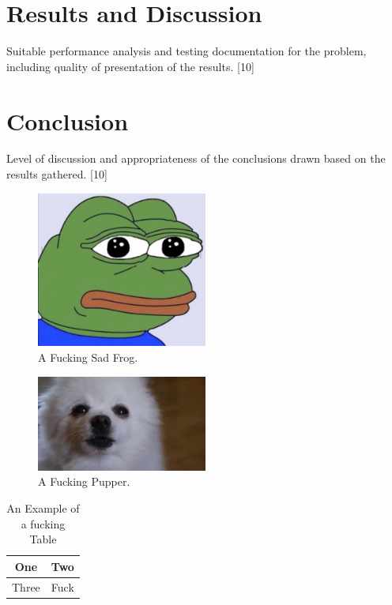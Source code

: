 \documentclass[journal,transmag]{IEEEtran}
\begin{document}
	\lipsum[1-2]
	
	\section{Results and Discussion}
	Suitable performance analysis and testing documentation
	for the problem, including quality of presentation of
	the results.
[10]
	
	\section{Conclusion}
	Level of discussion and appropriateness of the conclusions
	drawn based on the results gathered. [10]
	
	\begin{figure}[!t]
		\centering
		\includegraphics[width= 0.5\textwidth]{IMAGES/exampleImage}
		\caption{A Fucking Sad Frog.}
		\label{fig_frog}
	\end{figure}
	
	\begin{figure}[!t]
		\centering
		\includegraphics[width= 0.5\textwidth]{IMAGES/fig2}
		\caption{A Fucking Pupper.}
		\label{fig_pup}
	\end{figure}
	
	\begin{table}[!t]
		\renewcommand{\arraystretch}{1.3}
		\caption{An Example of a fucking Table}
		\label{table_example}
		\centering
		\begin{tabular}{|c|c|}
			\hline
			One & Two\\
			\hline
			Three & Fuck\\
			\hline
		\end{tabular}
	\end{table}
	
\end{document}
